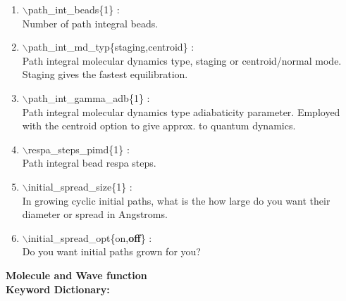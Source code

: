 \begin{itemize}
\begin{enumerate}
 \vspace{0.15in} \Large
 \item  $\backslash$path\_int\_beads\{1\} : \\
    \large
     Number of path integral beads.

 \vspace{0.15in} \Large
 \item  $\backslash$path\_int\_md\_typ\{staging,centroid\} : \\
    \large
     Path integral molecular dynamics type, staging or centroid/normal mode.
     Staging gives the fastest equilibration.

 \vspace{0.15in} \Large
 \item  $\backslash$path\_int\_gamma\_adb\{1\} : \\
    \large
     Path integral molecular dynamics type adiabaticity parameter.
     Employed with the centroid option to give approx. to quantum dynamics.

 \vspace{0.15in} \Large
 \item  $\backslash$respa\_steps\_pimd\{1\} : \\
    \large
     Path integral bead respa steps.

 \vspace{0.15in} \Large
 \item  $\backslash$initial\_spread\_size\{1\} : \\
    \large
    In growing cyclic initial paths, what is the how large do you
    want their diameter or spread in Angstroms.

 \vspace{0.15in} \Large
 \item  $\backslash$initial\_spread\_opt\{on,{\bf off}\} : \\
    \large
    Do you want initial paths grown for you?

\end{enumerate}

\end{itemize}


\clearpage
\begin{center}
\huge
{\bf Molecule and Wave function \\
Keyword Dictionary: } 
\end{center}

